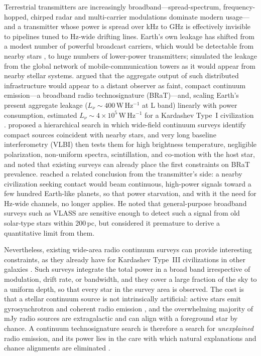 \documentclass[linenumbers]{aastex702}
\newcommand{\Lnu}{L_\nu}
\newcommand{\WHz}{\mathrm{W\,Hz^{-1}}}
\begin{document}
Terrestrial transmitters are increasingly broadband---spread-spectrum, frequency-hopped, chirped radar and multi-carrier modulations dominate modern usage---and a transmitter whose power is spread over kHz to GHz is effectively invisible to pipelines tuned to Hz-wide drifting lines. Earth's own leakage has shifted from a modest number of powerful broadcast carriers, which would be detectable from nearby stars \citep{Sullivan1978,LoebZaldarriaga2007,Sheikh2025}, to huge numbers of lower-power transmitters; \citet{Saide2023} simulated the leakage from the global network of mobile-communication towers as it would appear from nearby stellar systems. \citet{Garrett2026} argued that the aggregate output of such distributed infrastructure would appear to a distant observer as faint, compact continuum emission---a broadband radio technosignature (BRaT)---and, scaling Earth's present aggregate leakage ($\Lnu\sim400\,\WHz$ at L band) linearly with power consumption, estimated $\Lnu\sim4\times10^5\,\WHz$ for a Kardashev Type~I civilization \citep{Kardashev1964}. \citeauthor{Garrett2026} proposed a hierarchical search in which wide-field continuum surveys identify compact sources coincident with nearby stars, and very long baseline interferometry (VLBI) then tests them for high brightness temperature, negligible polarization, non-uniform spectra, scintillation, and co-motion with the host star, and noted that existing surveys can already place the first constraints on BRaT prevalence. \citet{Zuckerman2026} reached a related conclusion from the transmitter's side: a nearby civilization seeking contact would beam continuous, high-power signals toward a few hundred Earth-like planets, so that power starvation, and with it the need for Hz-wide channels, no longer applies. He noted that general-purpose broadband surveys such as VLASS are sensitive enough to detect such a signal from old solar-type stars within 200\,pc, but considered it premature to derive a quantitative limit from them.

Nevertheless, existing wide-area radio continuum surveys can provide interesting constraints, as they already have for Kardashev Type~III civilizations in other galaxies \citep{Garrett2015}. Such surveys integrate the total power in a broad band irrespective of modulation, drift rate, or bandwidth, and they cover a large fraction of the sky to a uniform depth, so that every star in the survey area is observed. The cost is that a stellar continuum source is not intrinsically artificial: active stars emit gyrosynchrotron and coherent radio emission \citep{GudelBenz1993,Callingham2021,Vedantham2022}, and the overwhelming majority of mJy radio sources are extragalactic and can align with a foreground star by chance. A continuum technosignature search is therefore a search for \emph{unexplained} radio emission, and its power lies in the care with which natural explanations and chance alignments are eliminated \citep{Garrett2026}.
\end{document}
